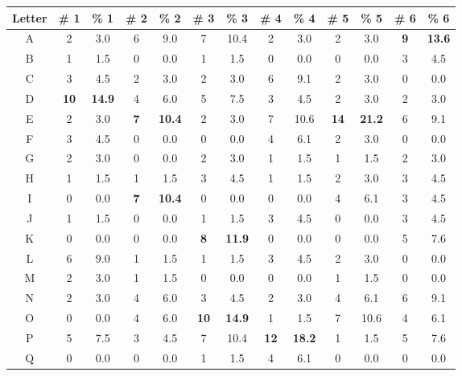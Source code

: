 \documentclass[12pt]{article}
\theoremstyle{remark}  %
\begin{document}
    \begin{table}[h]
        \begin{center}
            \begin{tabular}{c|cc|cc|cc|cc|cc|cc|}
                Letter & \# 1 & \% 1 & \# 2 & \% 2 & \# 3 & \% 3 & \# 4 & \% 4 & \# 5 & \% 5 & \# 6 & \% 6 \\
                \hline
                A & 2 & 3.0 & 6 & 9.0 & 7 & 10.4 & 2 & 3.0 & 2 & 3.0 & \textbf{9} & \textbf{13.6} \\
                B & 1 & 1.5 & 0 & 0.0 & 1 & 1.5 & 0 & 0.0 & 0 & 0.0 & 3 & 4.5 \\
                C & 3 & 4.5 & 2 & 3.0 & 2 & 3.0 & 6 & 9.1 & 2 & 3.0 & 0 & 0.0 \\
                D & \textbf{10} & \textbf{14.9} & 4 & 6.0 & 5 & 7.5 & 3 & 4.5 & 2 & 3.0 & 2 & 3.0 \\
                E & 2 & 3.0 & \textbf{7} & \textbf{10.4} & 2 & 3.0 & 7 & 10.6 & \textbf{14} & \textbf{21.2} & 6 & 9.1 \\
                F & 3 & 4.5 & 0 & 0.0 & 0 & 0.0 & 4 & 6.1 & 2 & 3.0 & 0 & 0.0 \\
                G & 2 & 3.0 & 0 & 0.0 & 2 & 3.0 & 1 & 1.5 & 1 & 1.5 & 2 & 3.0 \\
                H & 1 & 1.5 & 1 & 1.5 & 3 & 4.5 & 1 & 1.5 & 2 & 3.0 & 3 & 4.5 \\
                I & 0 & 0.0 & \textbf{7} & \textbf{10.4} & 0 & 0.0 & 0 & 0.0 & 4 & 6.1 & 3 & 4.5 \\
                J & 1 & 1.5 & 0 & 0.0 & 1 & 1.5 & 3 & 4.5 & 0 & 0.0 & 3 & 4.5 \\
                K & 0 & 0.0 & 0 & 0.0 & \textbf{8} & \textbf{11.9} & 0 & 0.0 & 0 & 0.0 & 5 & 7.6 \\
                L & 6 & 9.0 & 1 & 1.5 & 1 & 1.5 & 3 & 4.5 & 2 & 3.0 & 0 & 0.0 \\
                M & 2 & 3.0 & 1 & 1.5 & 0 & 0.0 & 0 & 0.0 & 1 & 1.5 & 0 & 0.0 \\
                N & 2 & 3.0 & 4 & 6.0 & 3 & 4.5 & 2 & 3.0 & 4 & 6.1 & 6 & 9.1 \\
                O & 0 & 0.0 & 4 & 6.0 & \textbf{10} & \textbf{14.9} & 1 & 1.5 & 7 & 10.6 & 4 & 6.1 \\
                P & 5 & 7.5 & 3 & 4.5 & 7 & 10.4 & \textbf{12} & \textbf{18.2} & 1 & 1.5 & 5 & 7.6 \\
                Q & 0 & 0.0 & 0 & 0.0 & 1 & 1.5 & 4 & 6.1 & 0 & 0.0 & 0 & 0.0 \\

\end{tabular}
\end{center}
\end{table}
\end{document}
